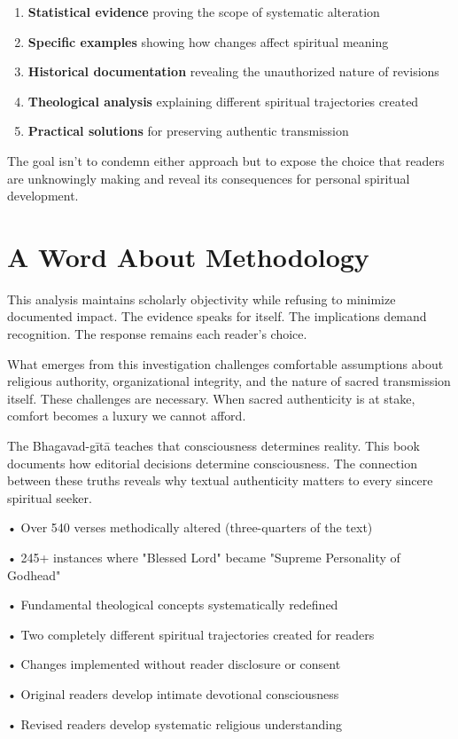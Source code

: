 \documentclass[11pt,twoside]{book}
\begin{document}
\begin{enumerate}
\item \textbf{\textbf{Statistical evidence}} proving the scope of systematic alteration
\item \textbf{\textbf{Specific examples}} showing how changes affect spiritual meaning
\item \textbf{\textbf{Historical documentation}} revealing the unauthorized nature of revisions
\item \textbf{\textbf{Theological analysis}} explaining different spiritual trajectories created
\item \textbf{\textbf{Practical solutions}} for preserving authentic transmission
\end{enumerate}

The goal isn't to condemn either approach but to expose the choice that readers are unknowingly making and reveal its consequences for personal spiritual development.
\section*{A Word About Methodology}
\label{sec:org8f659d3}

This analysis maintains scholarly objectivity while refusing to minimize documented impact. The evidence speaks for itself. The implications demand recognition. The response remains each reader's choice.

What emerges from this investigation challenges comfortable assumptions about religious authority, organizational integrity, and the nature of sacred transmission itself. These challenges are necessary. When sacred authenticity is at stake, comfort becomes a luxury we cannot afford.

The Bhagavad-gītā teaches that consciousness determines reality. This book documents how editorial decisions determine consciousness. The connection between these truths reveals why textual authenticity matters to every sincere spiritual seeker.

\begin{chapterfindingsbox}
• Over 540 verses methodically altered (three-quarters of the text)

• 245+ instances where "Blessed Lord" became "Supreme Personality of Godhead"

• Fundamental theological concepts systematically redefined

• Two completely different spiritual trajectories created for readers

• Changes implemented without reader disclosure or consent

• Original readers develop intimate devotional consciousness

• Revised readers develop systematic religious understanding
\end{chapterfindingsbox}
\end{document}
